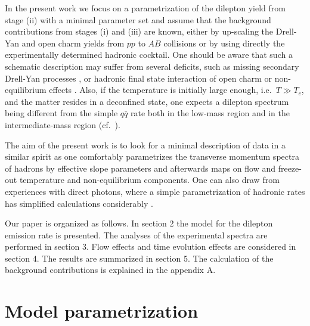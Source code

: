 In the present work we focus on a parametrization of the dilepton
yield from stage (ii) with a minimal parameter set 
and assume that the background
contributions from stages (i) and (iii) are known, either by up-scaling
the Drell-Yan and open charm yields from $pp$ to $AB$ collisions or by
using directly the experimentally determined hadronic cocktail.
One should be aware that such a schematic description may suffer from several
deficits, such as missing secondary Drell-Yan processes \cite{Stoecker},
or hadronic final state interaction of open charm \cite{Lin_Wang}
or non-equilibrium effects \cite{PLB_91}.
Also, if the temperature is initially large enough, i.e.\ $T \gg T_c$,
and the matter resides in a deconfined state, one expects a dilepton
spectrum being different from the simple $q \bar q$ rate both in the
low-mass region \cite{Peshier_Thoma} and in the intermediate-mass region
\cite{PRC_95} (cf.\ \cite{Aurenche}).

The aim of the present work is to look for a minimal 
description
of data in a similar spirit as one comfortably parametrizes the transverse
momentum spectra of hadrons by effective slope parameters and afterwards
maps on flow and freeze-out temperature and non-equilibrium components.
One can also draw from experiences with direct photons, where a simple
parametrization of hadronic rates has simplified calculations
considerably \cite{photons}. 

Our paper is organized as follows. In section 2 the model for the dilepton
emission rate is presented. The analyses of the experimental spectra
are performed in section 3. 
Flow effects and time evolution effects are considered in section 4.
The results are summarized in 
section 5. The calculation of the background contributions is
explained in the appendix A.

\section{Model parametrization}

